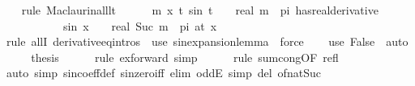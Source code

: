 \begin{isabellebody}
\ \ \isamarkupfalse%
\ {\isacharparenleft}{\kern0pt}rule\ Maclaurin{\isacharunderscore}{\kern0pt}all{\isacharunderscore}{\kern0pt}lt{\isacharparenright}{\kern0pt}\isanewline
\ \ \ \ \isamarkupfalse%
\ {\isachardoublequoteopen}{\isasymforall}m\ x{\isachardot}{\kern0pt}\ {\isacharparenleft}{\kern0pt}{\isacharparenleft}{\kern0pt}{\isasymlambda}t{\isachardot}{\kern0pt}\ sin\ {\isacharparenleft}{\kern0pt}t\ {\isacharplus}{\kern0pt}\ {}{\isacharslash}{\kern0pt}{}\ {\isacharasterisk}{\kern0pt}\ real\ m\ {\isacharasterisk}{\kern0pt}\ pi{\isacharparenright}{\kern0pt}{\isacharparenright}{\kern0pt}\ has{\isacharunderscore}{\kern0pt}real{\isacharunderscore}{\kern0pt}derivative\isanewline
\ \ \ \ \ \ \ \ \ \ \ sin\ {\isacharparenleft}{\kern0pt}x\ {\isacharplus}{\kern0pt}\ {}{\isacharslash}{\kern0pt}{}\ {\isacharasterisk}{\kern0pt}\ real\ {\isacharparenleft}{\kern0pt}Suc\ m{\isacharparenright}{\kern0pt}\ {\isacharasterisk}{\kern0pt}\ pi{\isacharparenright}{\kern0pt}{\isacharparenright}{\kern0pt}\ {\isacharparenleft}{\kern0pt}at\ x{\isacharparenright}{\kern0pt}{\isachardoublequoteclose}\isanewline
\ \ \ \ \ \ \isamarkupfalse%
\ {\isacharparenleft}{\kern0pt}rule\ allI\ derivative{\isacharunderscore}{\kern0pt}eq{\isacharunderscore}{\kern0pt}intros\ {\isacharbar}{\kern0pt}\ use\ sin{\isacharunderscore}{\kern0pt}expansion{\isacharunderscore}{\kern0pt}lemma\ \ force{\isacharparenright}{\kern0pt}{\isacharplus}{\kern0pt}\isanewline
\ \ \isamarkupfalse%
\ {\isacharparenleft}{\kern0pt}use\ False\ \ auto{\isacharparenright}{\kern0pt}\isanewline
\ \ \isamarkupfalse%
\ \isamarkupfalse%
\ {\isacharquery}{\kern0pt}thesis\isanewline
\ \ \ \ \isamarkupfalse%
\ {\isacharparenleft}{\kern0pt}rule\ ex{\isacharunderscore}{\kern0pt}forward{\isacharcomma}{\kern0pt}\ simp{\isacharparenright}{\kern0pt}\isanewline
\ \ \ \ \isamarkupfalse%
\ {\isacharparenleft}{\kern0pt}rule\ sum{\isachardot}{\kern0pt}cong{\isacharbrackleft}{\kern0pt}OF\ refl{\isacharbrackright}{\kern0pt}{\isacharparenright}{\kern0pt}\isanewline
\ \ \ \ \isamarkupfalse%
\ {\isacharparenleft}{\kern0pt}auto\ simp{\isacharcolon}{\kern0pt}\ sin{\isacharunderscore}{\kern0pt}coeff{\isacharunderscore}{\kern0pt}def\ sin{\isacharunderscore}{\kern0pt}zero{\isacharunderscore}{\kern0pt}iff\ elim{\isacharcolon}{\kern0pt}\ oddE\ simp\ del{\isacharcolon}{\kern0pt}\ of{\isacharunderscore}{\kern0pt}nat{\isacharunderscore}{\kern0pt}Suc{\isacharparenright}{\kern0pt}\isanewline

\end{isabellebody}
